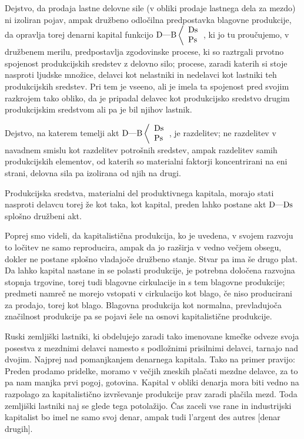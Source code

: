 \documentclass[kapital_02.tex]{subfiles}
\begin{document}
Dejstvo, da prodaja lastne delovne sile (v obliki prodaje lastnega dela za mezdo) ni izoliran pojav, ampak družbeno odločilna predpostavka blagovne produkcije, da opravlja torej denarni kapital funkcijo \( 
    \textrm{D}\textrm{---}\textrm{B}\left< 
    \begin{array}{l}
        \textrm{Ds}\\
        \textrm{Ps}\\
    \end{array}
    \right. 
\), ki jo tu proučujemo, v družbenem merilu, predpostavlja zgodovinske procese, ki so raztrgali prvotno spojenost produkcijskih sredstev z delovno silo; procese, zaradi katerih si stoje nasproti ljudske množice, delavci kot nelastniki in nedelavci kot lastniki teh produkcijskih sredstev. Pri tem je vseeno, ali je imela ta spojenost pred svojim razkrojem tako obliko, da je pripadal delavec kot produkcijsko sredstvo drugim produkcijskim sredstvom ali pa je bil njihov lastnik.

Dejstvo, na katerem temelji akt \( 
    \textrm{D}\textrm{---}\textrm{B}\left< 
    \begin{array}{l}
        \textrm{Ds}\\
        \textrm{Ps}\\
    \end{array}
    \right. 
\), je razdelitev; ne razdelitev v navadnem smislu kot razdelitev potrošnih sredstev, ampak razdelitev samih produkcijskih elementov, od katerih so materialni faktorji koncentrirani na eni strani, delovna sila pa izolirana od njih na drugi.

Produkcijska sredstva, materialni del produktivnega kapitala, morajo stati nasproti delavcu torej že kot taka, kot kapital, preden lahko postane akt \( \textrm{D}\textrm{---}\textrm{Ds} \) splošno družbeni akt.

Poprej smo videli, da kapitalistična produkcija, ko je uvedena, v svojem razvoju to ločitev ne samo reproducira, ampak da jo razširja v vedno večjem obsegu, dokler ne postane splošno vladajoče družbeno stanje. Stvar pa ima še drugo plat. Da lahko kapital nastane in se polasti produkcije, je potrebna določena razvojna stopnja trgovine, torej tudi blagovne cirkulacije in s tem blagovne produkcije; predmeti namreč ne morejo vstopati v cirkulacijo kot blago, če niso producirani za prodajo, torej kot blago. Blagovna produkcija kot normalna, prevladujoča značilnost produkcije pa se pojavi šele na osnovi kapitalistične produkcije.

Ruski zemljiški lastniki, ki obdelujejo zaradi tako imenovane kmečke odveze svoja posestva z mezdnimi delavci namesto s podložnimi prisilnimi delavci, tarnajo nad dvojim. Najprej nad pomanjkanjem denarnega kapitala. Tako na primer pravijo: Preden prodamo pridelke, moramo v večjih zneskih plačati mezdne delavce, za to pa nam manjka prvi pogoj, gotovina. Kapital v obliki denarja mora biti vedno na razpolago za kapitalistično izvrševanje produkcije prav zaradi plačila mezd. Toda zemljiški lastniki naj se glede tega potolažijo. Čas zaceli vse rane in industrijski kapitalist bo imel ne samo svoj denar, ampak tudi l'argent des autres [denar drugih].
\end{document}
